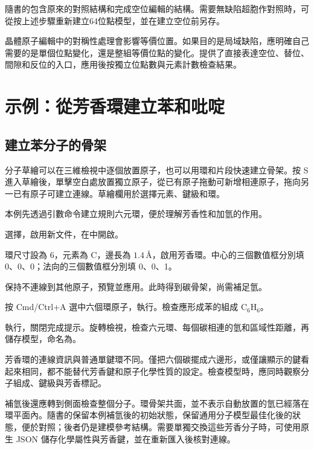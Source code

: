 隨書的包含原來的對照結構和完成空位編輯的結構。需要無缺陷超胞作對照時，可從按上述步驟重新建立64位點模型，並在建立空位前另存。

晶體原子編輯中的對稱性處理會影響等價位置。如果目的是局域缺陷，應明確自己需要的是單個位點變化，還是整組等價位點的變化。提供了直接表達空位、替位、間隙和反位的入口，應用後按獨立位點數與元素計數檢查結果。

\section{示例：從芳香環建立苯和吡啶}

\subsection{建立苯分子的骨架}

分子草繪可以在三維檢視中逐個放置原子，也可以用環和片段快速建立骨架。按 S 進入草繪後，單擊空白處放置獨立原子，從已有原子拖動可新增相連原子，拖向另一已有原子可建立連線。草繪欄用於選擇元素、鍵級和環。

本例先透過引數命令建立規則六元環，便於理解芳香性和加氫的作用。

\begin{steps}
  \item 選擇，啟用新文件，在中開啟。
  \item 環尺寸設為 6，元素為 C，邊長為 $1.4\,\text{\AA}$，啟用芳香環。中心的三個數值框分別填 0、0、0；法向的三個數值框分別填 0、0、1。
  \item 保持不連線到其他原子，預覽並應用。此時得到碳骨架，尚需補足氫。
  \item 按 Cmd/Ctrl+A 選中六個環原子，執行。檢查應形成苯的組成 $\mathrm{C_6H_6}$。
  \item 執行，關閉完成提示。旋轉檢視，檢查六元環、每個碳相連的氫和區域性距離，再儲存模型，命名為。
\end{steps}

芳香環的連線資訊與普通單鍵環不同。僅把六個碳擺成六邊形，或僅讓顯示的鍵看起來相同，都不能替代芳香鍵和原子化學性質的設定。檢查模型時，應同時觀察分子組成、鍵級與芳香標記。

補氫後還應轉到側面檢查整個分子。環骨架共面，並不表示自動放置的氫已經落在環平面內。隨書的保留本例補氫後的初始狀態，\mbox{}保留通用分子模型最佳化後的狀態，便於對照；後者仍是建模參考結構。需要單獨交換這些芳香分子時，可使用原生 JSON 儲存化學屬性與芳香鍵，並在重新匯入後核對連線。


